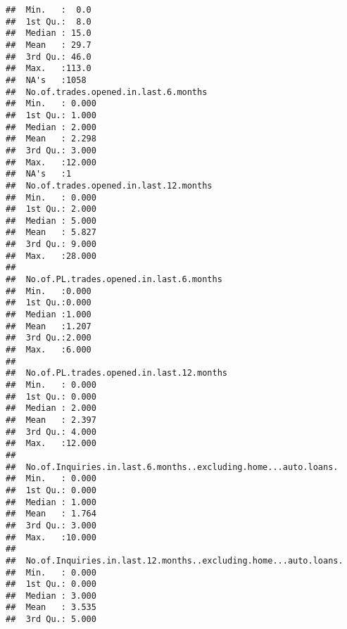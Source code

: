 \documentclass[]{article}
\begin{document}
\begin{verbatim}
##  Min.   :  0.0                         
##  1st Qu.:  8.0                         
##  Median : 15.0                         
##  Mean   : 29.7                         
##  3rd Qu.: 46.0                         
##  Max.   :113.0                         
##  NA's   :1058                          
##  No.of.trades.opened.in.last.6.months
##  Min.   : 0.000                      
##  1st Qu.: 1.000                      
##  Median : 2.000                      
##  Mean   : 2.298                      
##  3rd Qu.: 3.000                      
##  Max.   :12.000                      
##  NA's   :1                           
##  No.of.trades.opened.in.last.12.months
##  Min.   : 0.000                       
##  1st Qu.: 2.000                       
##  Median : 5.000                       
##  Mean   : 5.827                       
##  3rd Qu.: 9.000                       
##  Max.   :28.000                       
##                                       
##  No.of.PL.trades.opened.in.last.6.months
##  Min.   :0.000                          
##  1st Qu.:0.000                          
##  Median :1.000                          
##  Mean   :1.207                          
##  3rd Qu.:2.000                          
##  Max.   :6.000                          
##                                         
##  No.of.PL.trades.opened.in.last.12.months
##  Min.   : 0.000                          
##  1st Qu.: 0.000                          
##  Median : 2.000                          
##  Mean   : 2.397                          
##  3rd Qu.: 4.000                          
##  Max.   :12.000                          
##                                          
##  No.of.Inquiries.in.last.6.months..excluding.home...auto.loans.
##  Min.   : 0.000                                                
##  1st Qu.: 0.000                                                
##  Median : 1.000                                                
##  Mean   : 1.764                                                
##  3rd Qu.: 3.000                                                
##  Max.   :10.000                                                
##                                                                
##  No.of.Inquiries.in.last.12.months..excluding.home...auto.loans.
##  Min.   : 0.000                                                 
##  1st Qu.: 0.000                                                 
##  Median : 3.000                                                 
##  Mean   : 3.535                                                 
##  3rd Qu.: 5.000                                                 

\end{verbatim}
\end{document}
